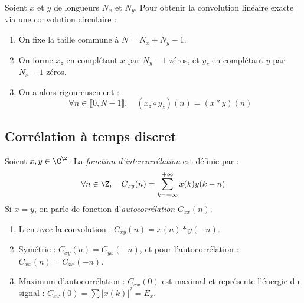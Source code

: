 \begin{theorem}
    Soient $x$ et $y$ de longueurs $N_x$ et $N_y$. Pour obtenir la convolution linéaire exacte via une convolution circulaire :
    \begin{enumerate}
        \item On fixe la taille commune à $N = N_x + N_y - 1$.
        \item On forme $x_z$ en complétant $x$ par $N_y - 1$ zéros, et $y_z$ en complétant $y$ par $N_x - 1$ zéros.
        \item On a alors rigoureusement :
            \begin{equation}
                \boxed{\forall n \in \llbracket 0, N-1 \rrbracket, \quad (x_z \circ y_z)(n) = (x * y)(n)}
            \end{equation}
    \end{enumerate}
\end{theorem}

\subsection{Corrélation à temps discret}

\begin{definition}
    Soient $x, y \in \C^\Z$. La \emph{fonction d'intercorrélation} est définie par : 
        \begin{equation}
            \forall n \in \Z, \quad C_{xy}(n) = \sum_{k=-\infty}^{+\infty} x(k) y(k - n) 
        \end{equation}
    Si $x = y$, on parle de fonction d'\emph{autocorrélation} $C_{xx}(n)$.
\end{definition}

\begin{prop}
    \begin{enumerate}[label=\roman*)]
        \item Lien avec la convolution : $C_{xy}(n) = x(n) * y(-n)$. 
        \item Symétrie : $C_{xy}(n) = C_{yx}(-n)$, et pour l'autocorrélation : $C_{xx}(n) = C_{xx}(-n)$.
        \item Maximum d'autocorrélation : $C_{xx}(0)$ est maximal et représente l'énergie du signal : $C_{xx}(0) = \sum |x(k)|^2 = E_x$.
    \end{enumerate}
\end{prop}

